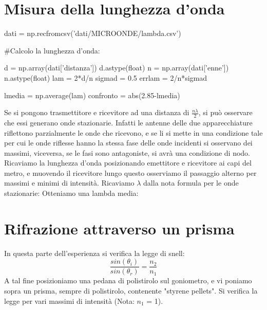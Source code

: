 \begin{center}
\end{center}


\section{Misura della lunghezza d'onda}

\begin{sagesilent}
dati = np.recfromcsv('dati/MICROONDE/lambda.csv')

#Calcolo la lunghezza d'onda:

d = np.array(dati['distanza'])
d.astype(float)
n = np.array(dati['enne'])
n.astype(float)
lam = 2*d/n
sigmad = 0.5
errlam = 2/n*sigmad

lmedia = np.average(lam)
confronto = abs(2.85-lmedia)


\end{sagesilent}

Se si pongono trasmettitore e ricevitore ad una distanza di $\frac{n \lambda}{2}$, si può osservare che essi generano onde stazionarie. Infatti le antenne delle due apparecchiature riflettono parzialmente le onde che ricevono, e se li si mette in una condizione tale per cui le onde riflesse hanno la stessa fase delle onde incidenti si osservano dei massimi, viceversa, se le fasi sono antagoniste, si avrà una condizione di nodo.
Ricaviamo la lunghezza d'onda posizionando emettitore e ricevitore ai capi del metro, e muovendo il ricevitore lungo questo osserviamo  il passaggio alterno per massimi e minimi di intensità. Ricaviamo $\lambda$ dalla nota formula per le onde stazionarie:
Otteniamo una lambda media: 



\section{Rifrazione attraverso un prisma}

In questa parte dell'esperienza si verifica la legge di snell:
\begin{equation}
\frac{sin(\theta_{i})}{sin(\theta_{r})} = \frac{n_2}{n_1}
\end{equation}
A tal fine posizioniamo una pedana di polistirolo sul goniometro, e vi poniamo sopra un prisma, sempre di polistirolo, contenente "styrene pellets". Si verifica la legge per vari massimi di intensità (Nota: $n_1$ = 1).




